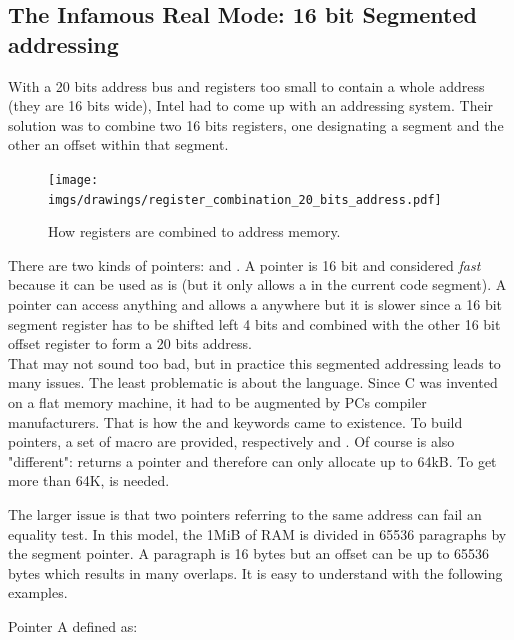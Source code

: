 \documentclass[book.tex]{subfiles}
\begin{document}
\subsection{The Infamous Real Mode: 16 bit Segmented addressing}
With a 20 bits address bus and registers too small to contain a whole address (they are 16 bits wide), Intel had to come up with an addressing system. Their solution was to combine two 16 bits registers, one designating a segment and the other an offset within that segment.\\
\par
\begin{figure}[H]
\centering
\texttt{[image: imgs/drawings/register\_combination\_20\_bits\_address.pdf]}
\caption{How registers are combined to address memory.}
\label{fig:register_comb_to_20_bits}
\end{figure}
\par
There are two kinds of pointers:  and . A  pointer is 16 bit and considered \emph{fast} because it can be used as is (but it only allows a  in the current code segment). A  pointer can access anything and allows a  anywhere but it is slower since a 16 bit segment register has to be shifted left 4 bits and combined with the other 16 bit offset register to form a 20 bits address.\\

That may not sound too bad, but in practice this segmented addressing leads to many issues.
The least problematic is about the language. Since C was invented on a flat memory machine, it had to be augmented by PCs compiler manufacturers. That is how the  and  keywords came to existence. To build pointers, a set of macro are provided, respectively  and . Of course  is also "different":  returns a  pointer and therefore can only allocate up to 64kB. To get more than 64K,  is needed.\\
\par
The larger issue is that two pointers referring to the same address can fail an equality test. In this model, the 1MiB of RAM is divided in 65536 paragraphs by the segment pointer. A paragraph is 16 bytes but an offset can be up to 65536 bytes which results in many overlaps. It is easy to understand with the following examples.\\
\par
Pointer A defined as:\\
\par
\begin{minipage}{\textwidth}

\end{minipage}
\end{document}
